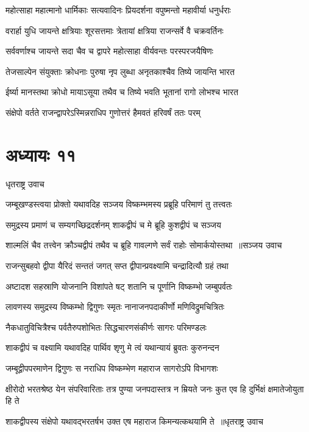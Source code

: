 \twolineshloka
{महोत्साहा महात्मानो धार्मिकाः सत्यवादिनः}
{प्रियदर्शना वपुष्मन्तो महावीर्या धनुर्धराः}


\twolineshloka
{वरार्हा युधि जायन्ते क्षत्रियाः शूरसत्तमाः}
{त्रेतायां क्षत्रिया राजन्सर्वे वै चक्रवर्तिनः}


\twolineshloka
{सर्ववर्णाश्च जायन्ते सदा चैव च द्वापरे}
{महोत्साहा वीर्यवन्तः परस्परजयैषिणः}


\twolineshloka
{तेजसाल्पेन संयुक्ताः क्रोधनाः पुरुषा नृप}
{लुब्धा अनृतकाश्चैव तिष्ये जायन्ति भारत}


\twolineshloka
{ईर्ष्या मानस्तथा क्रोधो मायाऽसूया तथैव च}
{तिष्ये भवति भूतानां रागो लोभश्च भारत}


\twolineshloka
{संक्षेपो वर्तते राजन्द्वापरेऽस्मिन्नराधिप}
{गुणोत्तरं हैमवतं हरिवर्षं ततः परम्}


\chapter{अध्यायः ११}
\twolineshloka
{धृतराष्ट्र उवाच}
{}


\twolineshloka
{जम्बूखण्डस्त्वया प्रोक्तो यथावदिह सञ्जय}
{विष्कम्भमस्य प्रब्रूहि परिमाणं तु तत्त्वतः}


\twolineshloka
{समुद्रस्य प्रमाणं च सम्यगच्छिद्रदर्शनम्}
{शाकद्वीपं च मे ब्रूहि कुशद्वीपं च सञ्जय}


\threelineshloka
{शाल्मलिं चैव तत्त्वेन क्रौञ्चद्वीपं तथैव च}
{ब्रूहि गावल्गणे सर्वं राहोः सोमार्कयोस्तथा ॥सञ्जय उवाच}
{}


\twolineshloka
{राजन्सुबहवो द्वीपा यैरिदं सन्ततं जगत्}
{सप्त द्वीपान्प्रवक्ष्यामि चन्द्रादित्यौ ग्रहं तथा}


\twolineshloka
{अष्टादश सहस्राणि योजनानि विशांपते}
{षट् शतानि च पूर्णानि विष्कम्भो जम्बुपर्वतः}


\twolineshloka
{लावणस्य समुद्रस्य विष्कम्भो द्विगुणः स्मृतः}
{नानाजनपदाकीर्णो मणिविद्रुमचित्रितः}


\twolineshloka
{नैकधातुविचित्रैश्च पर्वतैरुपशोभितः}
{सिद्धचारणसंकीर्णः सागरः परिमण्डलः}


\twolineshloka
{शाकद्वीपं च वक्ष्यामि यथावदिह पार्थिव}
{शृणु मे त्वं यथान्यायं ब्रुवतः कुरुनन्दन}


\twolineshloka
{जम्बूद्वीपपरमाणेन द्विगुणः स नराधिप}
{विष्कम्भेण महाराज सागरोऽपि विभागशः}


\threelineshloka
{क्षीरोदो भरतश्रेष्ठ येन संपरिवारिताः}
{तत्र पुण्या जनपदास्तत्र न म्रियते जनः}
{कुत एव हि दुर्भिक्षं क्षमातेजोयुता हि ते}


\threelineshloka
{शाकद्वीपस्य संक्षेपो यथावद्भरतर्षभ}
{उक्त एष महाराज किमन्यत्कथयामि ते ॥धृतराष्ट्र उवाच}
{}


